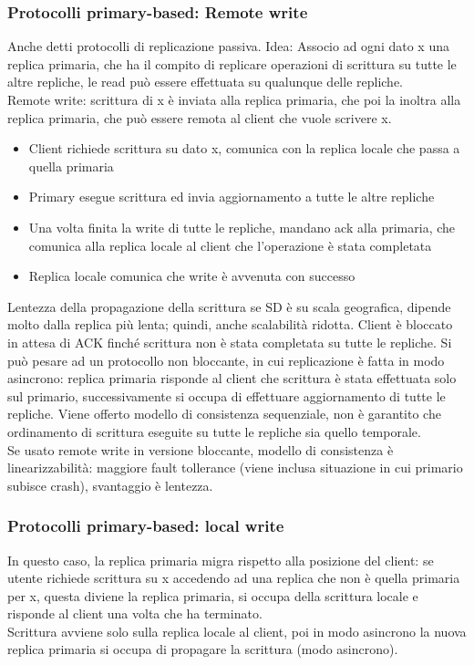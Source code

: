 \documentclass{article}
\begin{document}
\subsubsection{Protocolli primary-based: Remote write}
Anche detti protocolli di replicazione passiva. Idea:
Associo ad ogni dato x una replica primaria, che ha il compito di replicare operazioni di scrittura su tutte le altre repliche, le read può essere effettuata su qualunque delle repliche.\\ Remote write: scrittura di x è inviata alla replica primaria, che poi la inoltra alla replica primaria, che può essere remota al client che vuole scrivere x.
\begin{itemize}
\item Client richiede scrittura su dato x, comunica con la replica locale che passa a quella primaria
\item Primary esegue scrittura ed invia aggiornamento a tutte le altre repliche
\item Una volta finita la write di tutte le repliche, mandano ack alla primaria, che comunica alla replica locale al client che l'operazione è stata completata
\item Replica locale comunica che write è avvenuta con successo
\end{itemize}
Lentezza della propagazione della scrittura se SD è su scala geografica, dipende molto dalla replica più lenta; quindi, anche scalabilità ridotta. Client è bloccato in attesa di ACK finché scrittura non è stata completata su tutte le repliche. Si può pesare ad un protocollo non bloccante, in cui replicazione è fatta in modo asincrono: replica primaria risponde al client che scrittura è stata effettuata solo sul primario, successivamente si occupa di effettuare aggiornamento di tutte le repliche. Viene offerto modello di consistenza sequenziale, non è garantito che ordinamento di scrittura eseguite su tutte le repliche sia quello temporale.\\ Se usato remote write in versione bloccante, modello di consistenza è linearizzabilità: maggiore fault tollerance (viene inclusa situazione in cui primario subisce crash), svantaggio è lentezza.
\subsubsection{Protocolli primary-based: local write}
In questo caso, la replica primaria migra rispetto alla posizione del client: se utente richiede scrittura su x accedendo ad una replica che non è quella primaria per x, questa diviene la replica primaria, si occupa della scrittura locale e risponde al client una volta che ha terminato.\\ Scrittura avviene solo sulla replica locale al client, poi in modo asincrono la nuova replica primaria si occupa di propagare la scrittura (modo asincrono).
\end{document}
